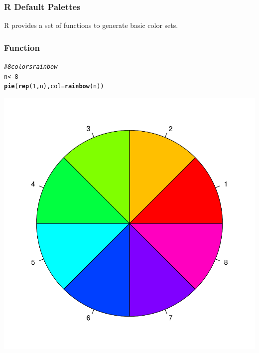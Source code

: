 \documentclass[12pt]{beamer}\usepackage[]{graphicx}\usepackage[]{color}
\makeatletter
\newcommand{\hlnum}[1]{\textcolor[rgb]{0.686,0.059,0.569}{#1}}%
\newcommand{\hlcom}[1]{\textcolor[rgb]{0.678,0.584,0.686}{\textit{#1}}}%
\newcommand{\hlstd}[1]{\textcolor[rgb]{0.345,0.345,0.345}{#1}}%
\newcommand{\hlkwb}[1]{\textcolor[rgb]{0.69,0.353,0.396}{#1}}%
\newcommand{\hlkwc}[1]{\textcolor[rgb]{0.333,0.667,0.333}{#1}}%
\newcommand{\hlkwd}[1]{\textcolor[rgb]{0.737,0.353,0.396}{\textbf{#1}}}%
\newenvironment{kframe}{%
 \def\at@end@of@kframe{}%
 \ifinner\ifhmode%
  \def\at@end@of@kframe{\end{minipage}}%
  \begin{minipage}{\columnwidth}%
 \fi\fi%
 \def\FrameCommand##1{\hskip\@totalleftmargin \hskip-\fboxsep
 \colorbox{shadecolor}{##1}\hskip-\fboxsep
     \hskip-\linewidth \hskip-\@totalleftmargin \hskip\columnwidth}%
 \MakeFramed {\advance\hsize-\width
   \@totalleftmargin\z@ \linewidth\hsize
   \@setminipage}}%
 {\par\unskip\endMakeFramed%
 \at@end@of@kframe}
\newenvironment{knitrout}{}{} %
\makeatother
\begin{document}

\begin{frame}
\frametitle{R Default Palettes}

R provides a set of functions to generate basic color sets.
 \bi
  \item {}
  \item {}
  \item {}
  \item {}
  \item {}
  \item {}
 \ei
\eb

\end{frame}


\begin{frame}[fragile]
\frametitle{Function }

\begin{knitrout}\scriptsize
{}\color{fgcolor}\begin{kframe}
\begin{alltt}
\hlcom{# 8 colors rainbow}
\hlstd{n} \hlkwb{<-} \hlnum{8}
\hlkwd{pie}\hlstd{(}\hlkwd{rep}\hlstd{(}\hlnum{1}\hlstd{, n),} \hlkwc{col} \hlstd{=} \hlkwd{rainbow}\hlstd{(n))}
\end{alltt}
\end{kframe}

{\centering \includegraphics[width=.4\linewidth,height=.4\linewidth]{figure/rainbow-1} 

}



\end{knitrout}

\end{frame}

\end{document}
